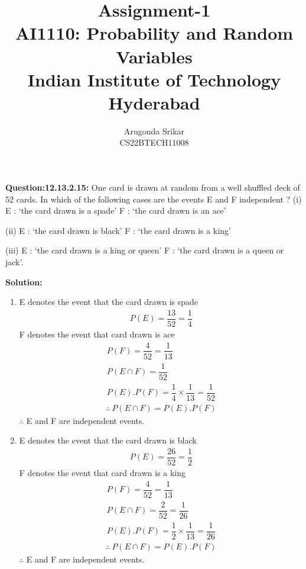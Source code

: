 \documentclass[12pt, journal]{IEEEtran}
\title{Assignment-1 \\ \Large AI1110: Probability and Random Variables \\ \large Indian Institute of Technology Hyderabad}
\author{Arugonda Srikar \\ \normalsize CS22BTECH11008}
\begin{document}
	\maketitle
	\textbf{Question:12.13.2.15:}
	One card is drawn at random from a well shuffled deck of 52 cards. In which of
	the following cases are the events E and F independent ?
		(i) E : ‘the card drawn is a spade’
		F : ‘the card drawn is an ace’
		
		(ii) E : ‘the card drawn is black’
		F : ‘the card drawn is a king’
		
		(iii) E : ‘the card drawn is a king or queen’
		F : ‘the card drawn is a queen or jack’.
	
	\textbf{Solution:}

	\begin{enumerate}[label=(\roman*)]
		\item 
			E denotes the event that the card drawn is spade 
			\begin{align}
				P(E) = \dfrac{13}{52} = \dfrac{1}{4}
			\end{align}
			F denotes the event that card drawn is ace 
			\begin{align}
				P(F) = \dfrac{4}{52} = \dfrac{1}{13} \\
				P(E \cap F) = \dfrac{1}{52}\\
				P(E).P(F) = \dfrac{1}{4} \times \dfrac{1}{13} = \dfrac{1}{52}
			\end{align}
			\begin{align}
				\therefore~P(E \cap F) = P(E).P(F)
			\end{align}
			$\therefore$  E and F are independent events. \\
		\item
			E denotes the event that the card drawn is black 
			\begin{align}
				P(E) = \dfrac{26}{52} = \dfrac{1}{2}
			\end{align}
			F denotes the event that card drawn is a king 
			\begin{align}
				P(F) = \dfrac{4}{52} = \dfrac{1}{13} \\
				P(E \cap F) = \dfrac{2}{52} = \dfrac{1}{26} \\
				P(E).P(F) = \dfrac{1}{2} \times \dfrac{1}{13} = \dfrac{1}{26}
			\end{align}
			\begin{align}
				\therefore~P(E \cap F) = P(E).P(F)
			\end{align}
			$\therefore$  E and F are independent events. \\

\end{enumerate}
\end{document}
